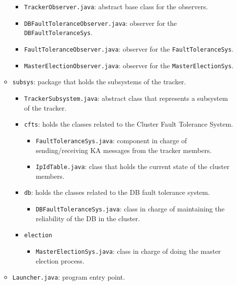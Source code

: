 \documentclass[twoside,a4paper,10pt]{article}
\begin{document}
\begin{itemize}
\begin{itemize}
    \begin{itemize}
    \item \texttt{TrackerObserver.java}: abstract base class for the observers.
    \item \texttt{DBFaultToleranceObserver.java}: observer for the
      \texttt{DBFaultToleranceSys}.
    \item \texttt{FaultToleranceObserver.java}: observer for the
      \texttt{FaultToleranceSys}.
    \item \texttt{MasterElectionObserver.java}: observer for the
      \texttt{MasterElectionSys}.
    \end{itemize}
  \item \texttt{subsys}: package that holds the subsystems of the tracker.
    
    \begin{itemize}
    \item \texttt{TrackerSubsystem.java}: abstract class that represents a
      subsystem of the tracker.
    \item \texttt{cfts}: holds the classes related to the Cluster Fault
      Tolerance System.
      \begin{itemize}
      \item \texttt{FaultToleranceSys.java}: component in charge of
        sending/receiving KA messages from the tracker members.
      \item \texttt{IpIdTable.java}: class that holds the current state of the
        cluster members.
      \end{itemize}
    \item \texttt{db}: holds the classes related to the DB fault tolerance
      system.
      \begin{itemize}
      \item \texttt{DBFaultToleranceSys.java}: class in charge of maintaining
        the reliability of the DB in the cluster.
      \end{itemize}
    \item \texttt{election}
      \begin{itemize}
      \item \texttt{MasterElectionSys.java}: class in charge of doing the master
        election process.
      \end{itemize}
    \end{itemize}
  \item \texttt{Launcher.java}: program entry point. 
  \end{itemize}
\end{itemize}
\end{document}
